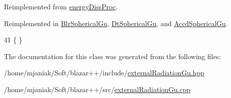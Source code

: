 Reimplemented from \hyperlink{classenergyDissProc_a6033524ea3d0fe38056bd74622f6c4ad}{energy\-Diss\-Proc}.



Reimplemented in \hyperlink{classBlrSphericalGu_a0054a1bc21351e6d68b8b5190ab1a8b0}{Blr\-Spherical\-Gu}, \hyperlink{classDtSphericalGu_ac940befec9ea9886b136f9d96c88620a}{Dt\-Spherical\-Gu}, and \hyperlink{classAccdSphericalGu_a278cae9b07c99dd7398121a77fa069c9}{Accd\-Spherical\-Gu}.


\begin{DoxyCode}
41 \{ \}
\end{DoxyCode}


The documentation for this class was generated from the following files\-:\begin{DoxyCompactItemize}
\item 
/home/mjaniak/\-Soft/blazar++/include/\hyperlink{externalRadiationGu_8hpp}{external\-Radiation\-Gu.\-hpp}\item 
/home/mjaniak/\-Soft/blazar++/src/\hyperlink{externalRadiationGu_8cpp}{external\-Radiation\-Gu.\-cpp}\end{DoxyCompactItemize}
